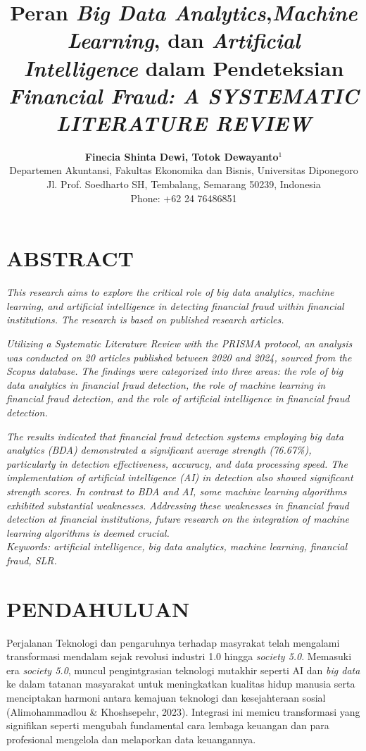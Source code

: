 \documentclass[12pt, a4paper]{article}
\title{\textbf{Peran \textit{Big Data Analytics},\textit{Machine Learning}, dan \textit{Artificial Intelligence} dalam Pendeteksian \textit{Financial Fraud: A SYSTEMATIC LITERATURE REVIEW}}}
\author{
    \textbf{Finecia Shinta Dewi, Totok Dewayanto$^{1}$} \\
    \small Departemen Akuntansi, Fakultas Ekonomika dan Bisnis, Universitas Diponegoro \\
    \small Jl. Prof. Soedharto SH, Tembalang, Semarang 50239, Indonesia \\
    \small Phone: +62 24 76486851
}
\date{}
\begin{document}
\maketitle

\section*{\centering ABSTRACT}
\textit{This research aims to explore the critical role of big data analytics, machine learning, and artificial intelligence in detecting financial fraud within financial institutions. The research is based on published research articles.}

\textit{Utilizing a Systematic Literature Review with the PRISMA protocol, an analysis was conducted on 20 articles published between 2020 and 2024, sourced from the Scopus database. The findings were categorized into three areas: the role of big data analytics in financial fraud detection, the role of machine learning in financial fraud detection, and the role of artificial intelligence in financial fraud detection.}

\textit{The results indicated that financial fraud detection systems employing big data analytics (BDA) demonstrated a significant average strength (76.67\%), particularly in detection effectiveness, accuracy, and data processing speed. The implementation of artificial intelligence (AI) in detection also showed significant strength scores. In contrast to BDA and AI, some machine learning algorithms exhibited substantial weaknesses. Addressing these weaknesses in financial fraud detection at financial institutions, future research on the integration of machine learning algorithms is deemed crucial.}\\

\textit{Keywords: artificial intelligence, big data analytics, machine learning, financial fraud, SLR.}

\section*{PENDAHULUAN}

\hspace{1cm}Perjalanan Teknologi dan pengaruhnya terhadap masyrakat telah mengalami transformasi mendalam sejak revolusi industri 1.0 hingga \textit{society 5.0}.
Memasuki era \textit{society 5.0}, muncul pengintgrasian teknologi mutakhir seperti AI dan \textit{big data} ke dalam tatanan masyarakat untuk 
meningkatkan kualitas hidup manusia serta menciptakan harmoni antara kemajuan teknologi dan kesejahteraan sosial (Alimohammadlou \& Khoshsepehr, 2023). 
Integrasi ini memicu transformasi yang signifikan seperti mengubah fundamental cara lembaga keuangan dan para profesional mengelola dan melaporkan data keuangannya.
\end{document}
